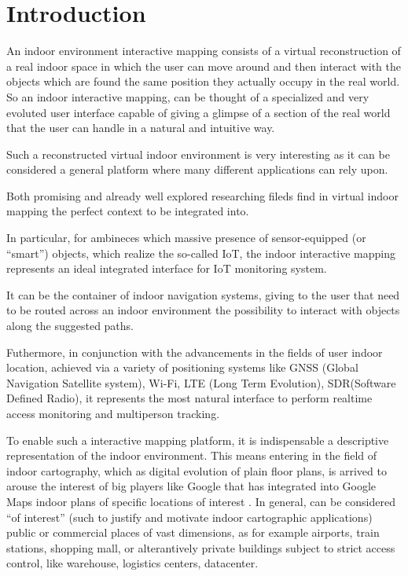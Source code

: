 \section{Introduction}\label{introduction}

An indoor environment interactive mapping consists of a virtual reconstruction of a real indoor space in which the user can move around and then interact with the objects which are found the same position they actually occupy in the real world.
So an indoor interactive mapping, can be thought of a specialized and very evoluted user interface capable of giving a glimpse of a section of the real world that the user can handle in a natural and intuitive way. 

Such a reconstructed virtual indoor environment is very interesting as it can be considered a general platform where many different applications can rely upon.

Both promising and already well explored researching fileds find in virtual indoor mapping the perfect context to be integrated into.

In particular, for ambineces which massive presence of sensor-equipped (or ``smart'') objects, which realize the so-called IoT, the indoor interactive mapping represents an ideal integrated interface for IoT monitoring system.

It can be the container of indoor navigation systems, giving to the user that need to be routed across an indoor environment the possibility to interact with objects along the suggested paths.

Futhermore, in conjunction with the advancements in the fields of user indoor location, achieved via a variety of positioning systems like GNSS (Global Navigation Satellite system), Wi-Fi, LTE (Long Term Evolution), SDR(Software Defined Radio), it represents the most natural interface to perform realtime access monitoring and multiperson tracking.

To enable such a interactive mapping platform, it is indispensable a descriptive representation of the indoor environment. This means entering in the field of indoor cartography, which as digital evolution of plain floor plans, is arrived to arouse the interest of big players like Google that has integrated into Google Maps indoor plans of specific locations of interest \cite{indoormaps}. In general, can be considered ``of interest'' (such to justify and motivate indoor cartographic applications) public or commercial places of vast dimensions, as for example airports, train stations, shopping mall, or alterantively private buildings subject to strict access control, like warehouse, logistics centers, datacenter. 

